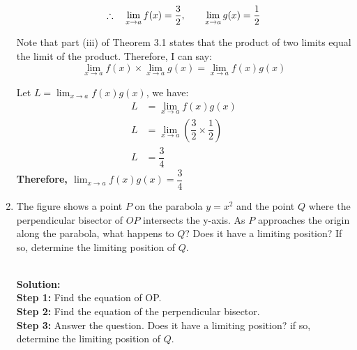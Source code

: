 \documentclass[12pt]{book}
\begin{document}
\begin{enumerate}
$$\therefore \quad \lim_{x\to a}\limits f(x) = \dfrac{3}{2}\text, \qquad \lim_{x\to a}\limits g(x) = \dfrac{1}{2}$$

\newpage %
Note that part (iii) of Theorem 3.1 states that the product of two limits equal the limit of the product. Therefore, I can say:
$$\lim_{x\to a}\limits f(x) \times \lim_{x\to a}\limits g(x) = \lim_{x\to a}\limits f(x)g(x)$$

Let $L = \lim_{x\to a}\limits f(x)g(x)$, we have:
\begin{align}
    L &= \lim_{x\to a}\limits f(x)g(x) \\
    L &= \lim_{x\to a}\limits \left(\dfrac{3}{2} \times \dfrac{1}{2}\right)\\
    L &= \dfrac{3}{4}
\end{align}
\textbf{Therefore, $\lim_{x\to a}\limits f(x)g(x) = \dfrac{3}{4}$}

\newpage


\item The figure shows a point $P$ on the parabola $y=x^2$ and the point $Q$ where the perpendicular bisector of $OP$ intersects the y-axis. As $P$ approaches the origin along the parabola, what happens to $Q$? Does it have a limiting position? If so, determine the limiting position of $Q$.

\begin{minipage}{0.5\textwidth}
    \begin{figure}[H]
    \end{figure} 
\end{minipage}\\
\setcounter{equation}{0}
\textbf{Solution:\\}
\textbf{Step 1:} Find the equation of OP.\\
\textbf{Step 2:} Find the equation of the perpendicular bisector.\\
\textbf{Step 3:} Answer the question. Does it have a limiting position? if so, determine the limiting position of $Q$.\\


\end{enumerate}
\end{document}
